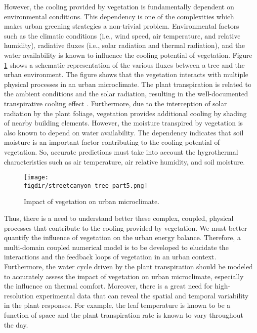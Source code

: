 However, the cooling provided by vegetation is fundamentally dependent on environmental conditions. This dependency is one of the complexities which makes urban greening strategies a non-trivial problem. Environmental factors such as the climatic conditions (i.e., wind speed, air temperature, and relative humidity), radiative fluxes (i.e., solar radiation and thermal radiation), and the water availability is known to influence the cooling potential of vegetation. Figure \ref{fig:vegetation_fluxes} shows a schematic representation of the various fluxes between a tree and the urban environment. The figure shows that the vegetation interacts with multiple physical processes in an urban microclimate. The plant transpiration is related to the ambient conditions and the solar radiation, resulting in the well-documented transpirative cooling effect \citep{Oke2017a,Farquhar2007,abtew2012evaporation,Melesse2008}. Furthermore, due to the interception of solar radiation by the plant foliage, vegetation provides additional cooling by shading of nearby building elements. However, the moisture transpired by vegetation is also known to depend on water availability. The dependency indicates that soil moisture is an important factor contributing to the cooling potential of vegetation. So, accurate predictions must take into account the hygrothermal characteristics such as air temperature, air relative humidity, and soil moisture.


\begin{figure}[t]
	\centering
	\texttt{[image: \\figdir/streetcanyon\_tree\_part5.png]}
	\caption{Impact of vegetation on urban microclimate.}
	\label{fig:vegetation_fluxes}
\end{figure}

Thus, there is a need to understand better these complex, coupled, physical processes that contribute to the cooling provided by vegetation. We must better quantify the influence of vegetation on the urban energy balance. Therefore, a multi-domain coupled numerical model is to be developed to elucidate the interactions and the feedback loops of vegetation in an urban context. Furthermore, the water cycle driven by the plant transpiration should be modeled to accurately assess the impact of vegetation on urban microclimate, especially the influence on thermal comfort. Moreover, there is a great need for high-resolution experimental data that can reveal the spatial and temporal variability in the plant responses. For example, the leaf temperature is known to be a function of space and the plant transpiration rate is known to vary throughout the day.

